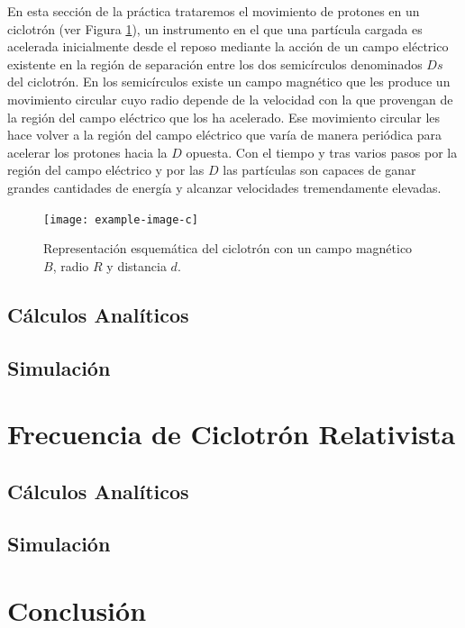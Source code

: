 \documentclass[journal]{IEEEtran}
\begin{document}
En esta sección de la práctica trataremos el movimiento de protones en un ciclotrón (ver Figura \ref{fig:ciclotron}), un instrumento en el que una partícula cargada es acelerada inicialmente desde el reposo mediante la acción de un campo eléctrico existente en la región de separación entre los dos semicírculos denominados $Ds$ del ciclotrón. En los semicírculos existe un campo magnético que les produce un movimiento circular cuyo radio depende de la velocidad con la que provengan de la región del campo eléctrico que los ha acelerado. Ese movimiento circular les hace volver a la región del campo eléctrico que varía de manera periódica para acelerar los protones hacia la $D$ opuesta. Con el tiempo y tras varios pasos por la región del campo eléctrico y por las $D$ las partículas son capaces de ganar grandes cantidades de energía y alcanzar velocidades tremendamente elevadas.

\begin{figure}[!htb]
    \texttt{[image: example-image-c]}
    \caption{Representación esquemática del ciclotrón con un campo magnético $B$, radio $R$ y distancia $d$.}
    \label{fig:ciclotron}
\end{figure}

\subsection{Cálculos Analíticos}

\subsection{Simulación}

\clearpage

\section{Frecuencia de Ciclotrón Relativista}
\label{sec:frecuencia}

\subsection{Cálculos Analíticos}

\subsection{Simulación}

\clearpage

\section{Conclusión}
\label{sec:conclusion}
\end{document}
